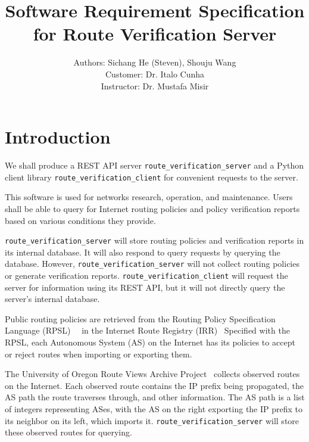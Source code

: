 \documentclass[12pt]{article}
\title{Software Requirement Specification for Route Verification Server}
\author
    {Authors: Sichang He (Steven), Shouju Wang\\
    Customer: Dr. Italo Cunha\\
    Instructor: Dr. Mustafa Misir
}
\begin{document}
\maketitle

\section{Introduction}
We shall produce a REST API server \verb|route_verification_server| and
a Python client library \verb|route_verification_client| for
convenient requests to the server.

This software is used for networks research, operation, and maintenance.
Users shall be able to query for Internet routing policies and
policy verification reports based on various conditions they provide.

\verb|route_verification_server| will store routing policies and
verification reports in its internal database.
It will also respond to query requests by querying the database.
However,
\verb|route_verification_server| will not collect routing policies or
generate verification reports.
\verb|route_verification_client| will request the server for information
using its REST API,
but it will not directly query the server's internal database.


Public routing policies are retrieved from
the Routing Policy Specification Language
(RPSL)~\cite{alaettinoglurfc}~\cite{blunk2005rfc} in
the Internet Route Registry (IRR)~\cite{irr2023}
Specified with the RPSL,
each Autonomous System (AS) on the Internet has its policies to
accept or reject routes when importing or exporting them.

The University of Oregon Route Views Archive Project~\cite{route2023}
collects observed routes on the Internet.
Each observed route contains the IP prefix being propagated,
the AS path the route traverses through,
and other information.
The AS path is a list of integers representing ASes,
with the AS on the right exporting the IP prefix to its neighbor on
its left,
which imports it.
\verb|route_verification_server| will store these observed routes for
querying.
\end{document}
